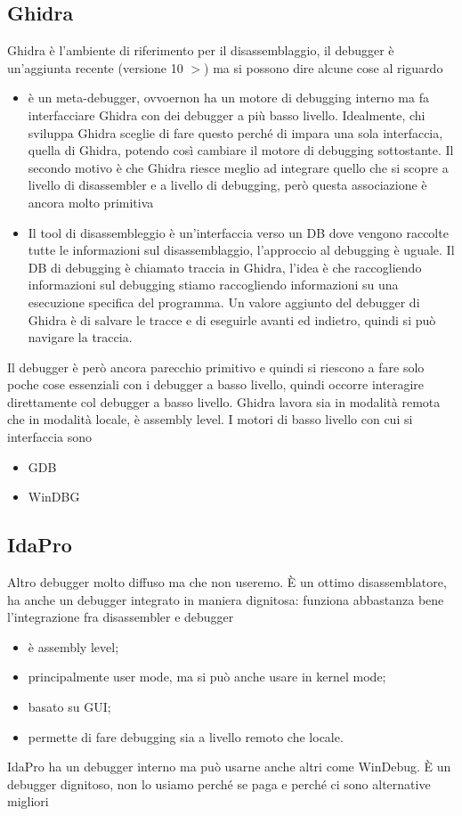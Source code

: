 \documentclass[12pt, oneside]{extbook}
\begin{document}
\subsection{Ghidra}
Ghidra è l'ambiente di riferimento per il disassemblaggio, il debugger è un'aggiunta recente (versione 10 $>$) ma si possono dire alcune cose al riguardo
\begin{itemize}
\item è un meta-debugger, ovvoernon ha un motore di debugging interno ma fa interfacciare Ghidra con dei debugger a più basso livello. Idealmente, chi sviluppa Ghidra sceglie di fare questo perché di impara una sola interfaccia, quella di Ghidra, potendo così cambiare il motore di debugging sottostante. Il secondo motivo è che Ghidra riesce meglio ad integrare quello che si scopre a livello di disassembler e a livello di debugging, però questa associazione è ancora molto primitiva
\item Il tool di disassembleggio è un'interfaccia verso un DB dove vengono raccolte tutte le informazioni sul disassemblaggio, l'approccio al debugging è uguale. Il DB di debugging è chiamato traccia in Ghidra, l'idea è che raccogliendo informazioni sul debugging stiamo raccogliendo informazioni su una esecuzione specifica del programma. Un valore aggiunto del debugger di Ghidra è di salvare le tracce e di eseguirle avanti ed indietro, quindi si può navigare la traccia.
\end{itemize}
Il debugger è però ancora parecchio primitivo e quindi si riescono a fare solo poche cose essenziali con i debugger a basso livello, quindi occorre interagire direttamente col debugger a basso livello. Ghidra lavora sia in modalità remota che in modalità locale, è assembly level. I motori di basso livello con cui si interfaccia sono 
\begin{itemize}
\item GDB
\item WinDBG
\end{itemize}
\subsection{IdaPro}
Altro debugger molto diffuso ma che non useremo. È un ottimo disassemblatore, ha anche un debugger integrato in maniera dignitosa: funziona abbastanza bene
l'integrazione fra disassembler e debugger
\begin{itemize}
\item è assembly level;
\item principalmente user mode, ma si può anche usare in kernel mode;
\item basato su GUI;
\item permette di fare debugging sia a livello remoto che locale.
\end{itemize}
IdaPro ha un debugger interno ma può usarne anche altri come WinDebug. È un debugger dignitoso, non lo usiamo perché se paga e perché ci sono alternative migliori
\end{document}
